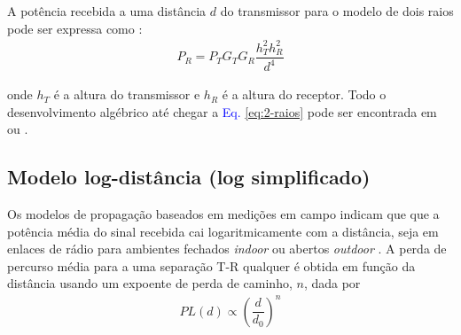 \begin{figure}[H]
	\centering
\end{figure}

A potência recebida a uma distância $d$ do transmissor para o modelo de dois raios pode ser expressa como \cite{rappaport2009}:
\begin{equation}
	\begin{aligned}
	\label{eq:2-raios}
		P_R = P_TG_TG_R\dfrac{h^2_Th^2_R}{d^4}
	\end{aligned}
\end{equation}

\noindent onde $h_T$ é a altura do transmissor e $h_R$ é a altura do receptor. Todo o desenvolvimento algébrico até chegar a \textcolor{blue}{Eq. \eqref{eq:2-raios}} pode ser encontrada em  ou .

\subsection{Modelo log-distância (log simplificado)}
\label{sub:log-distancia}

Os modelos de propagação baseados em medições em campo indicam que que a potência média do sinal recebida cai logaritmicamente com a distância, seja em enlaces de rádio para ambientes fechados \textit{indoor} ou abertos \textit{outdoor} \cite{rappaport2009}. A perda de percurso média para a uma separação T-R qualquer é obtida em função da distância usando um expoente de perda de caminho, $n$, dada por
\begin{equation}
	\begin{aligned}
	\label{eq:log-distancia}
		PL(d) \propto \left(\dfrac{d}{d_0}\right)^n
	\end{aligned}
\end{equation}

